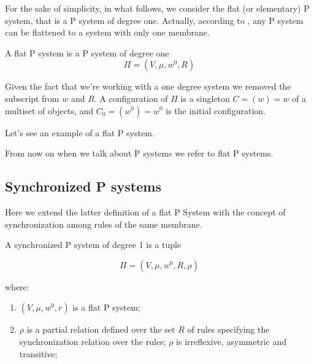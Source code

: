 For the sake of simplicity, in what follows, we consider the flat (or elementary) P system, that is a P system of degree one.
Actually, according to \cite{agrigoroaiei2010flattening}, any P system can be flattened to a system with only one membrane.

\begin{definition}
A flat P system is a P system of degree one
\[ \Pi = (V,\mu,w^0,R) \]

Given the fact that we're working with a one degree system we removed the subscript from $w$ and $R$. 
A configuration of $\Pi$ is a singleton $C=(w)=w$ of a multiset of objects, and 
$C_0=(w^0)=w^0$ is the initial configuration.
\end{definition}

Let's see an example of a flat P system.

\begin{figure}[h]
\centering


\caption{}
\label{}
\end{figure}

From now on when we talk about P systems we refer to flat P systems.

\subsection{Synchronized P systems}

Here we extend the latter definition of a flat P System with the concept of synchronization among rules of the same membrane. 

\begin{definition}
A synchronized P system of degree 1 is a tuple

\[ \Pi = (V,\mu,w^0,R,\rho) \]

where:
\begin{enumerate}
    \item $(V,\mu,w^0,r)$ is a flat P system;    
    \item $\rho$ is a partial relation defined over the set $R$ of rules specifying
    the synchronization relation over the rules;
    $\rho$ is irreflexive, asymmetric and transitive;
\end{enumerate}
\end{definition}

